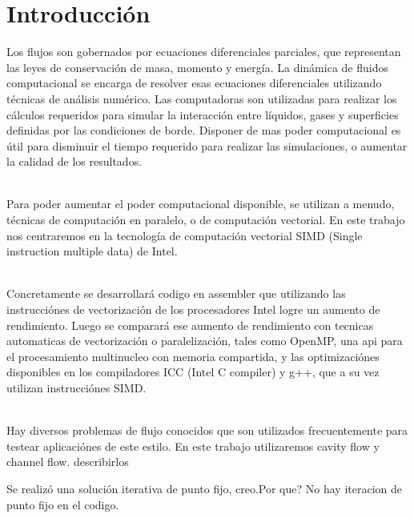 \section{Introducción}%
Los flujos son gobernados por ecuaciones diferenciales parciales, que representan las leyes de conservación de masa, momento y energía. La dinámica de fluidos computacional se encarga de resolver esas ecuaciones diferenciales utilizando técnicas de análisis numérico. Las computadoras son utilizadas para realizar los cálculos requeridos para simular la interacción entre líquidos, gases y superficies definidas por las condiciones de borde. Disponer de mas poder computacional es útil para disminuir el tiempo requerido para realizar las simulaciones, o aumentar la calidad de los resultados.

~\\
Para poder aumentar el poder computacional disponible, se utilizan a menudo, técnicas de computación en paralelo, o de computación vectorial. En este trabajo nos centraremos en la tecnología de computación vectorial SIMD (Single instruction multiple data) de Intel.

~\\
Concretamente se desarrollará codigo en assembler que utilizando las instrucciónes de vectorización de los procesadores Intel logre un aumento de rendimiento. Luego se comparará ese aumento de rendimiento con tecnicas automaticas de vectorización o paralelización, tales como OpenMP, una api para el procesamiento multinucleo con memoria compartida, y las optimizaciónes disponibles en los compiladores ICC (Intel C compiler) y g++, que a su vez utilizan instrucciónes SIMD.

~\\
Hay diversos problemas de flujo conocidos que son utilizados frecuentemente para testear aplicaciónes de este estilo. En este trabajo utilizaremos cavity flow y channel flow. \colorbox{BurntOrange}{describirlos}

Se realizó una solución iterativa de punto fijo, creo.\colorbox{BurntOrange}{Por que? No hay iteracion de punto fijo en el codigo.}

